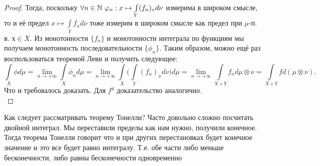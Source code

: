 \begin{proof}
Тогда, поскольку $\forall n \in \mathbb{N} \   \varphi_n: x \mapsto \int\limits_Y (f_n)_xd\nu$ измерима в широком смысле, то и её предел $x \mapsto \int\limits_Y f_xd\nu$ тоже измерим в широком смысле как предел при $\mu$-п. в. $х \in X$. Из монотонности $\{f_n\}$ и монотонности интеграла по функциям мы получаем монотонность последовательности $\{\phi_n\}$. Таким образом, можно ещё раз воспользоваться теоремой Леви и получить следующее: \[\int\limits_X \phi d\mu = \lim\limits_{n \rightarrow +\infty} \int\limits_X \phi_n d\mu = \lim\limits_{n \rightarrow +\infty} \int\limits_X \biggl(\int\limits_Y (f_n)_xd\nu\biggr)d\mu = \lim\limits_{n \rightarrow +\infty} \int\limits_{X \times Y} f_n d\mu\otimes\nu = \int\limits_{X \times Y} fd(\mu\otimes\nu) .\]
Что и требовалось доказать. Для $f^y$ доказательство аналогично.\\
\end{proof}
\begin{note}
    Как следует рассматривать теорему Тонелли? Часто довольно сложно посчитать двойной интеграл. Мы переставили пределы как нам нужно, получили конечное. Тогда теорема Тонелли говорит что и при других перестановках будет конечное значение и это все будет равно интегралу. Т.е. обе части либо меньше бесконечности, либо равны бесконечности одновременно
\end{note}

